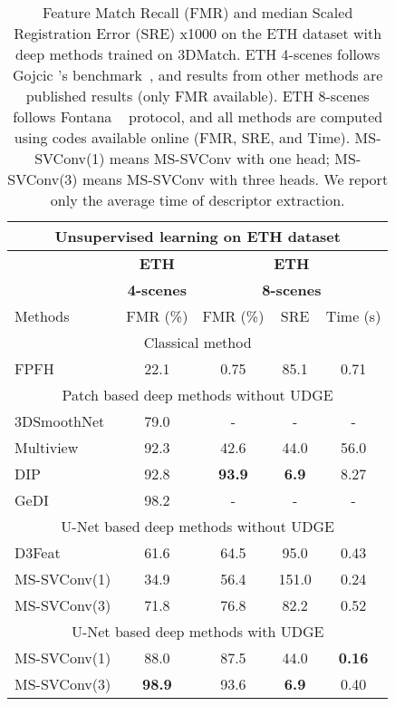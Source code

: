 \documentclass[10pt,twocolumn,letterpaper]{article}
\begin{document}
\begin{table}[ht]
\centering
\small
\tabcolsep=0.11cm
\begin{tabular}[t]{lc|ccc}
\toprule
\multicolumn{5}{c}{\textbf{Unsupervised learning on ETH dataset}} \\
\midrule
& \textbf{ETH} & \multicolumn{3}{c}{\textbf{ETH}} \\
& \textbf{4-scenes} & \multicolumn{3}{c}{\textbf{8-scenes}} \\
\midrule
Methods & FMR (\%) & FMR (\%) & SRE & Time (s)\\
\midrule
\multicolumn{5}{c}{Classical method} \\
FPFH~\cite{rusu_fast_2009} & 22.1 & 0.75 & 85.1 & 0.71 \\
\midrule
\multicolumn{5}{c}{Patch based deep methods without UDGE} \\
3DSmoothNet~\cite{gojcic2018perfect} & 79.0 & - & - & - \\
Multiview~\cite{Li_2020_CVPR} & 92.3 & 42.6 & 44.0 & 56.0 \\
DIP~\cite{Poiesi2021} & 92.8 & \bf{93.9} & \textbf{6.9} & 8.27   \\
GeDI~\cite{Poiesi2021gedi} & 98.2 & - & - & - \\
\midrule
\multicolumn{5}{c}{U-Net based deep methods without UDGE} \\
D3Feat~\cite{bai2020d3feat} & 61.6 & 64.5 & 95.0 & 0.43 \\
MS-SVConv(1) & 34.9 & 56.4 & 151.0 & 0.24  \\
MS-SVConv(3) & 71.8 & 76.8 & 82.2 & 0.52 \\

\midrule
\multicolumn{5}{c}{U-Net based deep methods with UDGE} \\
MS-SVConv(1) & 88.0 & 87.5 & 44.0 & \bf{0.16} \\
MS-SVConv(3) & \textbf{98.9} & 93.6 & \bf{6.9} & 0.40 \\
\bottomrule
\end{tabular}
\caption{Feature Match Recall (FMR) and median Scaled Registration Error (SRE) x1000 on the ETH dataset with deep methods trained on 3DMatch. ETH 4-scenes follows Gojcic \etal's benchmark~\cite{gojcic2018perfect}, and results from other methods are published results (only FMR available). ETH 8-scenes follows Fontana \etal~\cite{fontana2020benchmark} protocol, and all methods are computed using codes available online (FMR, SRE, and Time). MS-SVConv(1) means MS-SVConv with one head; MS-SVConv(3) means MS-SVConv with three heads.  We report only the average time of descriptor extraction. }
\label{tab:unsupervised}
\end{table}
\end{document}
